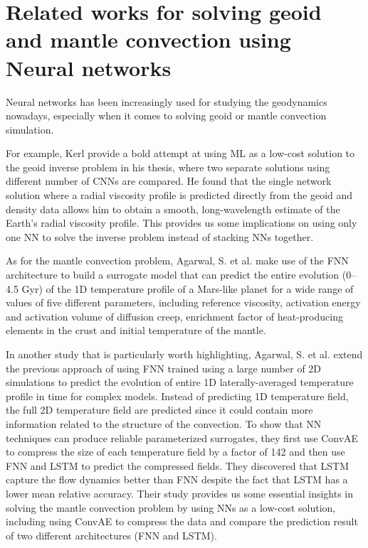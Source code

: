 \section{Related works for solving geoid and mantle convection using Neural networks}

Neural networks has been increasingly used for studying the geodynamics nowadays, especially when it comes to solving geoid or mantle convection simulation. 

For example, Kerl provide a bold attempt at using ML as a low-cost solution to the geoid inverse problem in his thesis, where two separate solutions using different number of CNNs are compared.\citep{kerl2022geoid} He found that the single network solution where a radial viscosity profile is predicted directly from the geoid and density data allows him to obtain a smooth, long-wavelength estimate of the Earth’s radial viscosity profile. This provides us some implications on using only one NN to solve the inverse problem instead of stacking NNs together.

As for the mantle convection problem, Agarwal, S. et al. make use of the FNN architecture to build a surrogate model that can predict the entire evolution (0–4.5 Gyr) of the 1D temperature profile of a Mars-like planet for a wide range of values of five different parameters, including reference viscosity, activation energy and activation volume of diffusion creep, enrichment factor of heat-producing elements in the crust and initial temperature of the mantle.\citep{10.1093_gji_ggaa234}

In another study that is particularly worth highlighting, Agarwal, S. et al. extend the previous approach \citep{10.1093_gji_ggaa234} of using FNN trained using a large number of 2D simulations to predict the evolution of entire 1D laterally-averaged temperature profile in time for complex models. Instead of predicting 1D temperature field, the full 2D temperature field are predicted since it could contain more information related to the structure of the convection.\citep{10.1103_physrevfluids.6.113801} To show that NN techniques can produce reliable parameterized surrogates, they first use ConvAE to compress the size of each temperature field by a factor of 142 and then use FNN and LSTM to predict the compressed fields. They discovered that LSTM capture the flow dynamics better than FNN despite the fact that LSTM has a lower mean relative accuracy. Their study provides us some essential insights in solving the mantle convection problem by using NNs as a low-cost solution, including using ConvAE to compress the data and compare the prediction result of two different architectures (FNN and LSTM).

